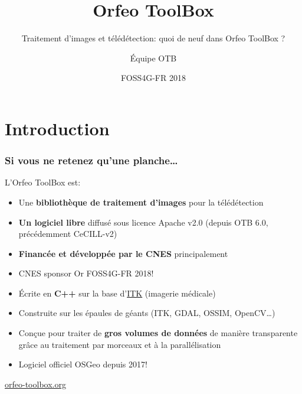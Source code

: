 \documentclass[8pt]{beamer}
\title{Orfeo ToolBox}
\subtitle{Traitement d'images et télédétection: quoi de neuf dans Orfeo ToolBox ?}
\author{Équipe OTB}%
\date{FOSS4G-FR 2018}
\begin{document}
\begin{frame}
\titlepage
\end{frame}

\section*{Introduction}

\begin{frame}
\frametitle{Si vous ne retenez qu'une planche\ldots}
\begin{block}{L'Orfeo ToolBox est:}
\begin{itemize}
\item Une \textbf{bibliothèque de traitement d'images} pour la télédétection
\item \textbf{Un logiciel libre} diffusé sous licence Apache v2.0 (depuis OTB 6.0, précédemment CeCILL-v2)
\item \textbf{Financée et développée par le CNES} principalement 
\item \alert{CNES sponsor Or FOSS4G-FR 2018!}
\item Écrite en \textbf{C++} sur la base d'\href{www.itk.org}{ITK} (imagerie médicale)
\item Construite sur les épaules de géants (ITK, GDAL, OSSIM, OpenCV\ldots)
\item Conçue pour traiter de \textbf{gros volumes de données} de manière transparente grâce au traitement par morceaux et à la parallélisation
\item \alert{Logiciel officiel OSGeo depuis 2017!}
\end{itemize}
\end{block}

\begin{center}
{\huge\textcolor{red}{\href{http://www.orfeo-toolbox.org}{orfeo-toolbox.org}}}
\end{center}

\end{frame}
\end{document}

